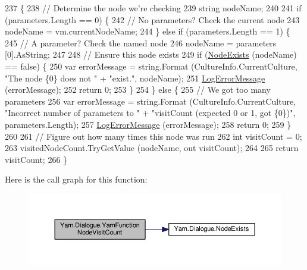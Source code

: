 \begin{DoxyCode}
237         \{
238             \textcolor{comment}{// Determine the node we're checking}
239             \textcolor{keywordtype}{string} nodeName;
240 
241             \textcolor{keywordflow}{if} (parameters.Length == 0) \{
242                 \textcolor{comment}{// No parameters? Check the current node}
243                 nodeName = vm.currentNodeName;
244             \} \textcolor{keywordflow}{else} \textcolor{keywordflow}{if} (parameters.Length == 1) \{
245                 \textcolor{comment}{// A parameter? Check the named node}
246                 nodeName = parameters [0].AsString;
247 
248                 \textcolor{comment}{// Ensure this node exists}
249                 \textcolor{keywordflow}{if} (\hyperlink{a00090_a93bb76a1f9a4058f225ff4cee97483c6}{NodeExists} (nodeName) == \textcolor{keyword}{false}) \{
250                     var errorMessage = string.Format (CultureInfo.CurrentCulture, \textcolor{stringliteral}{"The node \{0\} does not "} 
      + \textcolor{stringliteral}{"exist."}, nodeName);
251                     \hyperlink{a00090_a9801e83dd044d6498fdf6ebcc6bec5ac}{LogErrorMessage} (errorMessage);
252                     \textcolor{keywordflow}{return} 0;
253                 \}
254             \} \textcolor{keywordflow}{else} \{
255                 \textcolor{comment}{// We got too many parameters}
256                 var errorMessage = string.Format (CultureInfo.CurrentCulture, \textcolor{stringliteral}{"Incorrect number of
       parameters to "} + \textcolor{stringliteral}{"visitCount (expected 0 or 1, got \{0\})"}, parameters.Length);
257                 \hyperlink{a00090_a9801e83dd044d6498fdf6ebcc6bec5ac}{LogErrorMessage} (errorMessage);
258                 \textcolor{keywordflow}{return} 0;
259             \}
260 
261             \textcolor{comment}{// Figure out how many times this node was run}
262             \textcolor{keywordtype}{int} visitCount = 0;
263             visitedNodeCount.TryGetValue (nodeName, out visitCount);
264 
265             \textcolor{keywordflow}{return} visitCount;
266         \}
\end{DoxyCode}


Here is the call graph for this function\-:
\nopagebreak
\begin{figure}[H]
\begin{center}
\leavevmode
\includegraphics[width=350pt]{a00090_a10c9f22d3f55e74f091cd6069c431094_cgraph}
\end{center}
\end{figure}




